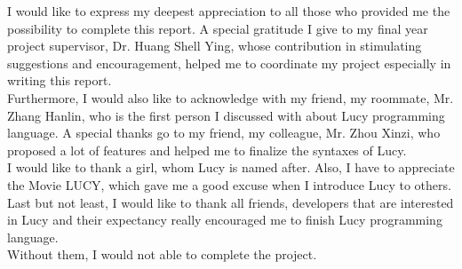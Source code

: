 
I would like to express my deepest appreciation to all those who provided me the possibility to complete this report. A special gratitude I give to my final year project supervisor, Dr. Huang Shell Ying, whose contribution in stimulating suggestions and encouragement, helped me to coordinate my project especially in writing this report. \\
Furthermore, I would also like to acknowledge with my friend, my roommate, Mr. Zhang Hanlin, who is the first person I discussed with about Lucy programming language. A special thanks go to my friend, my colleague, Mr. Zhou Xinzi, who proposed a lot of features and helped me to finalize the syntaxes of Lucy. \\
I would like to thank a girl, whom Lucy is named after. Also, I have to appreciate the Movie LUCY, which gave me a good excuse when I introduce Lucy to others. \\
Last but not least, I would like to thank all friends, developers that are interested in Lucy and their expectancy really encouraged me to finish Lucy programming language. \\
Without them, I would not able to complete the project.
